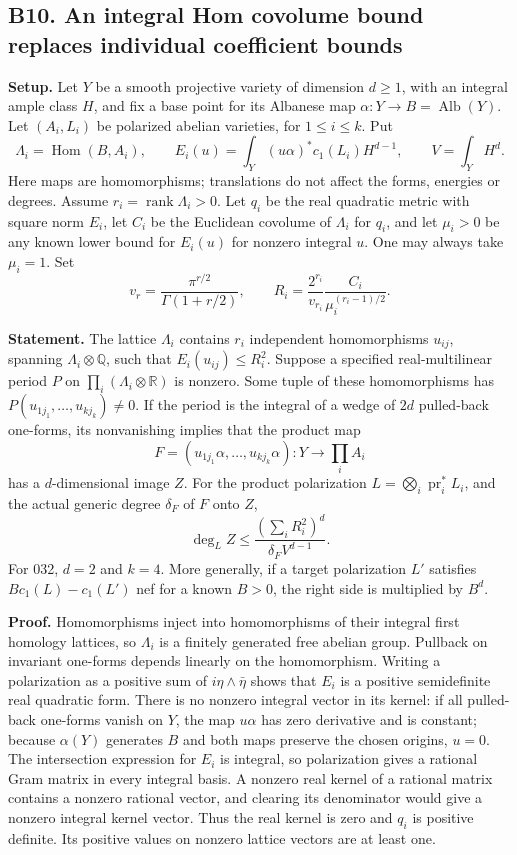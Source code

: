 \documentclass[11pt,a4paper]{article}
\theoremstyle{definition}
\begin{document}
\subsection{B10. An integral Hom covolume bound replaces individual coefficient bounds}\label{b10.-an-integral-hom-covolume-bound-replaces-individual-coefficient-bounds}

\textbf{Setup.} Let \(Y\) be a smooth projective variety of dimension \(d\ge1\), with an integral ample class \(H\), and fix a base point for its Albanese map \(\alpha:Y\to B=\operatorname{Alb}(Y)\). Let \((A_i,L_i)\) be polarized abelian varieties, for \(1\le i\le k\). Put \[
 \Lambda_i=\operatorname{Hom}(B,A_i),\qquad
 E_i(u)=\int_Y (u\alpha)^*c_1(L_i)H^{d-1},\qquad
 V=\int_YH^d.
\] Here maps are homomorphisms; translations do not affect the forms, energies or degrees. Assume \(r_i=\operatorname{rank}\Lambda_i>0\). Let \(q_i\) be the real quadratic metric with square norm \(E_i\), let \(C_i\) be the Euclidean covolume of \(\Lambda_i\) for \(q_i\), and let \(\mu_i>0\) be any known lower bound for \(E_i(u)\) for nonzero integral \(u\). One may always take \(\mu_i=1\). Set \[
 v_r=\frac{\pi^{r/2}}{\Gamma(1+r/2)},\qquad
 R_i=\frac{2^{r_i}}{v_{r_i}}\frac{C_i}{\mu_i^{(r_i-1)/2}}.
\]

\textbf{Statement.} The lattice \(\Lambda_i\) contains \(r_i\) independent homomorphisms \(u_{ij}\), spanning \(\Lambda_i\otimes\mathbb Q\), such that \(E_i(u_{ij})\le R_i^2\). Suppose a specified real-multilinear period \(P\) on \(\prod_i(\Lambda_i\otimes\mathbb R)\) is nonzero. Some tuple of these homomorphisms has \(P(u_{1j_1},\ldots,u_{kj_k})\ne0\). If the period is the integral of a wedge of \(2d\) pulled-back one-forms, its nonvanishing implies that the product map \[
 F=(u_{1j_1}\alpha,\ldots,u_{kj_k}\alpha):Y\longrightarrow\prod_i A_i
\] has a \(d\)-dimensional image \(Z\). For the product polarization \(L=\bigotimes_i\operatorname{pr}_i^*L_i\), and the actual generic degree \(\delta_F\) of \(F\) onto \(Z\), \[
 \deg_L Z\le\frac{(\sum_iR_i^2)^d}{\delta_F V^{d-1}}.
\tag{B10.1}
\] For 032, \(d=2\) and \(k=4\). More generally, if a target polarization \(L'\) satisfies \(B c_1(L)-c_1(L')\) nef for a known \(B>0\), the right side is multiplied by \(B^d\).

\textbf{Proof.} Homomorphisms inject into homomorphisms of their integral first homology lattices, so \(\Lambda_i\) is a finitely generated free abelian group. Pullback on invariant one-forms depends linearly on the homomorphism. Writing a polarization as a positive sum of \(i\eta\wedge\bar\eta\) shows that \(E_i\) is a positive semidefinite real quadratic form. There is no nonzero integral vector in its kernel: if all pulled-back one-forms vanish on \(Y\), the map \(u\alpha\) has zero derivative and is constant; because \(\alpha(Y)\) generates \(B\) and both maps preserve the chosen origins, \(u=0\). The intersection expression for \(E_i\) is integral, so polarization gives a rational Gram matrix in every integral basis. A nonzero real kernel of a rational matrix contains a nonzero rational vector, and clearing its denominator would give a nonzero integral kernel vector. Thus the real kernel is zero and \(q_i\) is positive definite. Its positive values on nonzero lattice vectors are at least one.
\end{document}
